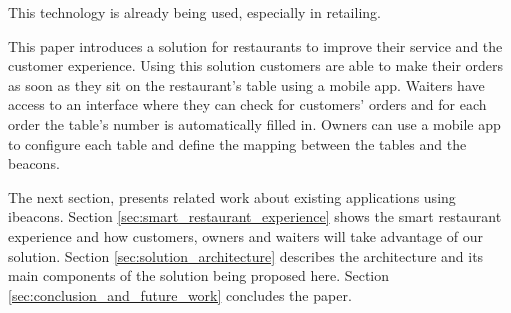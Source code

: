 This technology is already being used, especially in retailing.

This paper introduces a solution for restaurants to improve their
service and the customer experience. Using this solution customers
are able to make their orders as soon as they sit on
the restaurant's table using a mobile app.
Waiters have access to an interface where they can check for customers'
orders and for each order the table's number is automatically filled in.
Owners can use a mobile app to configure each table and define the
mapping between the tables
and the beacons.

The next section, presents related work about existing applications using ibeacons.
Section \ref{sec:smart_restaurant_experience} shows the smart restaurant
experience and how customers, owners and waiters will take advantage of our
solution. Section \ref{sec:solution_architecture} describes the architecture
and its main components
of the solution being proposed here.
Section \ref{sec:conclusion_and_future_work} concludes the paper.

